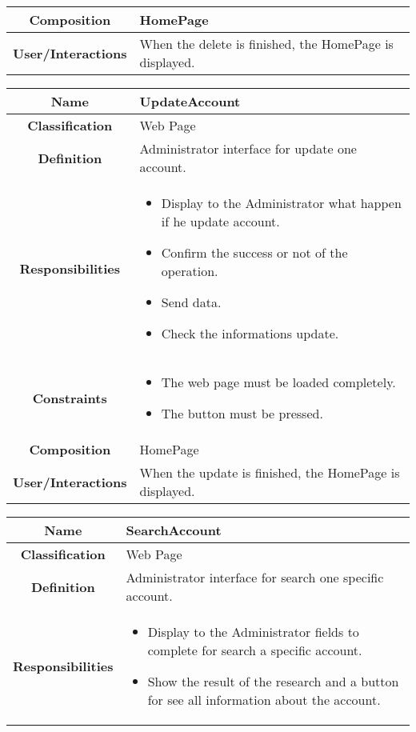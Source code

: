 \documentclass[11pt, a4paper,titlepage]{article}
\begin{document}
\begin{enumerate}
\begin{tabularx}{\textwidth}{| c | X |}
	\\
	\hline
	\textbf{Composition} & HomePage
	\\
	\hline
	\textbf{User/Interactions} &
	When the delete is finished, the HomePage is displayed.
	\\
	\hline 
\end{tabularx}
\begin{tabularx}{\textwidth}{| c | X |}
	\hline
	\textbf{Name} &
	UpdateAccount
	\\
	\hline
	\textbf{Classification} &
	Web Page
	\\
	\hline
	\textbf{Definition} &
	Administrator interface for update one account.\\
	\hline
	\textbf{Responsibilities} &
	\begin{itemize}
		\item Display to the Administrator what happen if he update account.
		\item Confirm the success or not of the operation.
		\item Send data.
		\item Check the informations update.
	\end{itemize}
	\\
	\hline
	\textbf{Constraints} &
	\begin{itemize}
		\item  The web page must be loaded completely.
		\item The button must be pressed.
	\end{itemize}
	\\
	\hline
	\textbf{Composition} & HomePage
	\\
	\hline
	\textbf{User/Interactions} &
	When the update is finished, the HomePage is displayed.
	\\
	\hline 
\end{tabularx}
\begin{tabularx}{\textwidth}{| c | X |}
	\hline
	\textbf{Name} &
	SearchAccount
	\\
	\hline
	\textbf{Classification} &
	Web Page
	\\
	\hline
	\textbf{Definition} &
	Administrator interface for search one specific account.\\
	\hline
	\textbf{Responsibilities} &
	\begin{itemize}
		\item Display to the Administrator fields to complete for search a specific account.
		\item Show the result of the research and a button for see all information about the account.

\end{itemize}
\end{tabularx}
\end{enumerate}
\end{document}
